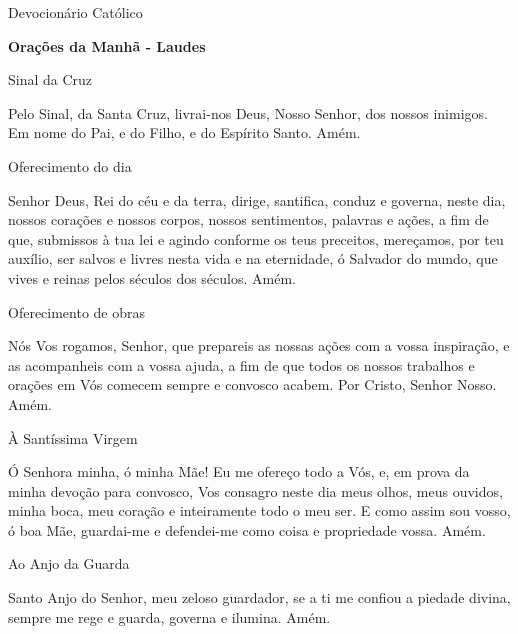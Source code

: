 \documentclass{book}
\begin{document}
\begin{center}
    \textcolor{VioletRed2}{\huge{Devocionário Católico}}
\end{center}
\newpage
\begin{center}
    \textbf{Orações da Manhã - Laudes}
\end{center}
\begin{center}
    Sinal da Cruz
\end{center}
\begin{flushleft}
    Pelo Sinal, \grecrossRed{} da Santa Cruz, livrai-nos Deus, \grecrossRed{} Nosso Senhor, dos nossos \grecrossRed{} inimigos. Em nome do Pai, \grecrossRed{} e do Filho, e do Espírito Santo. Amém.
\end{flushleft}
\begin{center}
    Oferecimento do dia
\end{center}
\begin{flushleft}
    Senhor Deus, Rei do céu e da terra, dirige, santifica, conduz e governa, neste dia, nossos corações e nossos corpos, nossos sentimentos, palavras e ações, a fim de que, submissos à tua lei e agindo conforme os teus preceitos, mereçamos, por teu auxílio, ser salvos e livres nesta vida e na eternidade, ó Salvador do mundo, que vives e reinas pelos séculos dos séculos. Amém.
\end{flushleft}
\begin{center}
    Oferecimento de obras
\end{center}
\begin{flushleft}
    Nós Vos rogamos, Senhor, que prepareis as nossas ações com a vossa inspiração, e as acompanheis com a vossa ajuda, a fim de que todos os nossos trabalhos e orações em Vós comecem sempre e convosco acabem. Por Cristo, Senhor Nosso. Amém.
\end{flushleft}
\begin{center}
    À Santíssima Virgem
\end{center}
\begin{flushleft}
    Ó Senhora minha, ó minha Mãe! Eu me ofereço todo a Vós, e, em prova da minha devoção para convosco, Vos consagro neste dia meus olhos, meus ouvidos, minha boca, meu coração e inteiramente todo o meu ser. E como assim sou vosso, ó boa Mãe, guardai-me e defendei-me como coisa e propriedade vossa. Amém.
\end{flushleft}
\begin{center}
    Ao Anjo da Guarda
\end{center}
\begin{flushleft}
    Santo Anjo do Senhor, meu zeloso guardador, se a ti me confiou a piedade divina, sempre me rege e guarda, governa e ilumina. Amém.
\end{flushleft}
\end{document}
